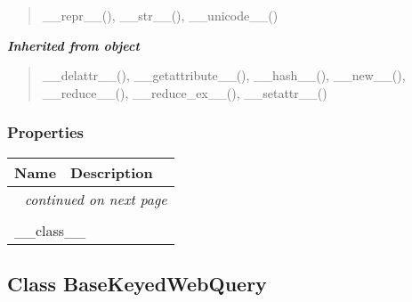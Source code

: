 \begin{quote}
\_\_repr\_\_(), \_\_str\_\_(), \_\_unicode\_\_()
\end{quote}

\large{\textbf{\textit{Inherited from object}}}

\begin{quote}
\_\_delattr\_\_(), \_\_getattribute\_\_(), \_\_hash\_\_(), \_\_new\_\_(), \_\_reduce\_\_(), \_\_reduce\_ex\_\_(), \_\_setattr\_\_()
\end{quote}


  \subsubsection{Properties}

    \vspace{-1cm}
\hspace{\varindent}\begin{longtable}{|p{\varnamewidth}|p{\vardescrwidth}|l}
\cline{1-2}
\cline{1-2} \centering \textbf{Name} & \centering \textbf{Description}& \\
\cline{1-2}
\endhead\cline{1-2}\multicolumn{3}{r}{\small\textit{continued on next page}}\\\endfoot\cline{1-2}
\endlastfoot\multicolumn{2}{|l|}{\textit{Inherited from object}}\\
\multicolumn{2}{|p{\varwidth}|}{\raggedright \_\_class\_\_}\\
\cline{1-2}
\end{longtable}



\subsection{Class BaseKeyedWebQuery}

